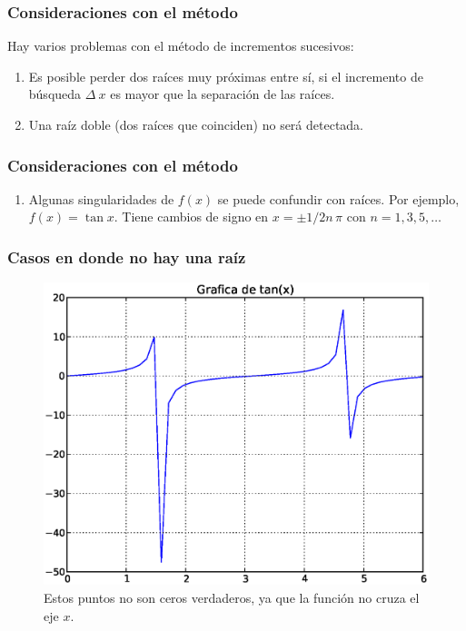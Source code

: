 \documentclass[12pt]{beamer}
\begin{document}
\begin{frame}
\frametitle{Consideraciones con el método}
Hay varios problemas con el método de incrementos sucesivos:
\begin{enumerate}[<+->]
\item Es posible perder dos raíces muy próximas entre sí, si el incremento de búsqueda $\Delta \: x$ es mayor que la separación de las raíces.
\item Una raíz doble (dos raíces que coinciden) no será detectada.
\seti
\end{enumerate}
\end{frame}
\begin{frame}
\frametitle{Consideraciones con el método}
\begin{enumerate}[<+->]
\conti
\item Algunas singularidades de $f (x)$ se puede confundir con raíces. Por ejemplo, $f (x) = \tan x$. Tiene cambios de signo en $x = \pm 1/2 n \, \pi$ con $n = 1, 3, 5,\ldots$
\end{enumerate}
\end{frame}
\begin{frame}
\frametitle{Casos en donde no hay una raíz}
\begin{figure}
	\centering
	\includegraphics[scale=0.4]{Imagenes/raices05.eps}
	\caption{Estos puntos no son ceros verdaderos, ya que la función no cruza el eje $x$.}
\end{figure}
\end{frame}
\end{document}
